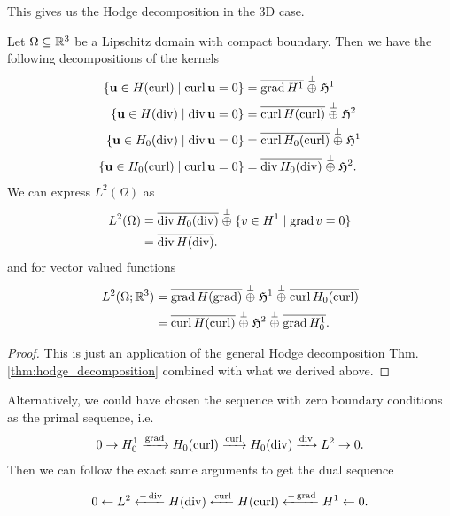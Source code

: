 \documentclass[../master_thesis.tex]{subfiles}
\begin{document}
This gives us the Hodge decomposition in the 3D case.

\begin{theorem}\label{thm:hodge_decomposition_in_3d}
    Let $\Omega \subseteq \mathbb{R}^3$ be a Lipschitz domain with compact boundary. Then we have the 
    following decompositions of the kernels
    \begin{align*}
        \{ \mathbf{u} \in H(\operatorname{curl}) \mid \operatorname{curl} \mathbf{u} = 0\}
        &= \overline{\operatorname{grad} H^1} \stackrel{\perp}{\oplus} 
            \mathfrak{H}^1
        \\ \{ \mathbf{u} \in H(\operatorname{div}) \mid \operatorname{div} \mathbf{u} = 0\}
        &= \overline{\operatorname{curl} H(\operatorname{curl})} \stackrel{\perp}{\oplus} 
            \mathfrak{H}^2
        \\ \{ \mathbf{u} \in H_0(\operatorname{div}) \mid \operatorname{div} \mathbf{u} = 0\}
        &= \overline{\operatorname{curl} H_0(\operatorname{curl})} \stackrel{\perp}{\oplus} 
            \mathfrak{H}^1
        \\ \{ \mathbf{u} \in H_0(\operatorname{curl}) \mid \operatorname{curl} \mathbf{u} = 0\}
        &= \overline{\operatorname{div} H_0(\operatorname{div})} \stackrel{\perp}{\oplus} 
            \mathfrak{H}^2.
    \end{align*}
    We can express $L^2(\Omega)$ as
    \begin{align*}
        L^2(\Omega) &= \overline{\operatorname{div} H_0(\operatorname{div})} \stackrel{\perp}{\oplus} 
            \{ v \in H^1 \mid \operatorname{grad} v = 0 \}
        \\ &= \overline{\operatorname{div} H(\operatorname{div})}.
    \end{align*}
    and for vector valued functions
    \begin{align*}
        L^2(\Omega;\mathbb{R}^3) &= \overline{\operatorname{grad} H(\operatorname{grad})} 
            \stackrel{\perp}{\oplus} \mathfrak{H}^1 
            \stackrel{\perp}{\oplus} \overline{\operatorname{curl} H_0(\operatorname{curl})} 
        \\ &= \overline{\operatorname{curl} H(\operatorname{curl})}
            \stackrel{\perp}{\oplus} \mathfrak{H}^2
            \stackrel{\perp}{\oplus} \overline{\operatorname{grad} H^1_0}.
    \end{align*}
\end{theorem}
\begin{proof}
    This is just an application of the general Hodge decomposition 
    Thm.\,\ref{thm:hodge_decomposition} combined with what we derived above.
\end{proof}


\begin{remark}
    Alternatively, we could have chosen the sequence with zero boundary conditions
    as the primal sequence, i.e. 
    \begin{align*}
        0 \rightarrow H^1_0 \xrightarrow{\operatorname{grad}} H_0(\operatorname{curl})
        \xrightarrow{\operatorname{curl}} H_0(\operatorname{div}) 
        \xrightarrow{\operatorname{div}} L^2 \rightarrow 0.
    \end{align*}
    Then we can follow the exact same arguments to get the dual sequence 

    \begin{align*}
        0 \leftarrow L^2 \xleftarrow{-\operatorname{div}} H(\operatorname{div})
            \xleftarrow{\operatorname{curl}} H(\operatorname{curl}) 
            \xleftarrow{-\operatorname{grad}} H^1 \leftarrow 0.
    \end{align*}
\end{remark}
\end{document}
